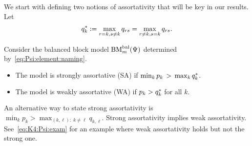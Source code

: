 We start with defining two notions of assortativity that will be key in our results.  Let
\begin{align}\label{eq:qs:def}
  q^*_k := \max_{r=k,s\neq k} q_{rs} = \max_{r\neq k,s= k} q_{rs}.
\end{align}
\begin{defn}\label{def:strong:weak:assort}
  Consider the balanced block model $\textrm{BM}^{\textrm{bal}}_m(\Psi)$ determined by~\eqref{eq:Psi:element:naming}.
  \begin{itemize}
    \item  The model is strongly assortative (SA) if   $\min_{k} p_k \, > \, \max_k q^*_k$.
    \item  The model is weakly assortative (WA) if   $p_k > q^*_k$ for all $k$.
  \end{itemize}
\end{defn}
An alternative way to state strong assortativity is $\min_{k} p_k >  \max_{(k,\ell): \; k \neq \ell} q_{k,\ell}$.   Strong assortativity implies weak assortativity. See~\eqref{eq:K4:Psi:exam} for an example where weak assortativity holds but not the strong one.

